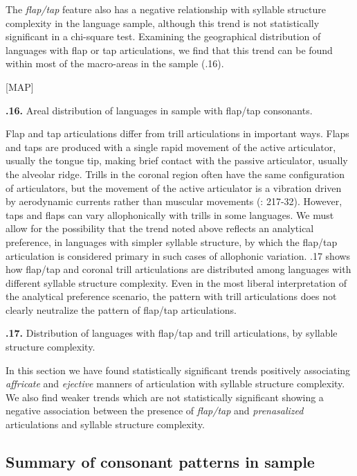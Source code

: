   The \textit{flap/tap} feature also has a negative relationship with syllable structure complexity in the language sample, although this trend is not statistically significant in a chi-square test. Examining the geographical distribution of languages with flap or tap articulations, we find that this trend can be found within most of the macro-areas in the sample (.16).

[MAP]

\textbf{.16.} Areal distribution of languages in sample with flap/tap consonants.

  Flap and tap articulations differ from trill articulations in important ways. Flaps and taps are produced with a single rapid movement of the active articulator, usually the tongue tip, making brief contact with the passive articulator, usually the alveolar ridge. Trills in the coronal region often have the same configuration of articulators, but the movement of the active articulator is a vibration driven by aerodynamic currents rather than muscular movements (\citealt{LadefogedMaddieson1996}: 217-32). However, taps and flaps can vary allophonically with trills in some languages. We must allow for the possibility that the trend noted above reflects an analytical preference, in languages with simpler syllable structure, by which the flap/tap articulation is considered primary in such cases of allophonic variation. .17 shows how flap/tap and coronal trill articulations are distributed among languages with different syllable structure complexity. Even in the most liberal interpretation of the analytical preference scenario, the pattern with trill articulations does not clearly neutralize the pattern of flap/tap articulations.

\textbf{.17.} Distribution of languages with flap/tap and trill articulations, by syllable structure complexity.

  In this section we have found statistically significant trends positively associating \textit{affricate} and \textit{ejective} manners of articulation with syllable structure complexity. We also find weaker trends which are not statistically significant showing a negative association between the presence of \textit{flap/tap} and \textit{prenasalized} articulations and syllable structure complexity.

\subsection{Summary of consonant patterns in sample}\label{sec:4.4.6}

